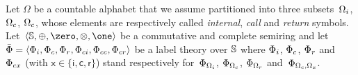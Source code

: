 \noindent
\label{sec:SWVPA-def}
Let $\Omega$ be a countable alphabet 
that we assume partitioned into three 
subsets~$\Omegai$, $\Omegac$, $\Omegac$,
whose elements are respectively called 
\emph{internal}, \emph{call} and \emph{return} symbols.
Let~$\< \Semiring, \oplus, \zero, \otimes, \one>$ be a commutative and complete semiring and let  
$\bar\Phi = \< \Phii, \Phic, \Phir, \Phici, \Phicc, \Phicr>$ 
be a label theory over $\mathbb{S}$
where $\Phii$, $\Phic$, $\Phir$ and~$\Phicx$ (with $\mathsf{x} \in \{ \mathsf{i}, \mathsf{c}, \mathsf{r}\}$) 
stand respectively 
for~$\Phi_\Omegai$, $\Phi_\Omegac$, $\Phi_\Omegar$ and~$\Phi_{\Omegac, \Omega_\mathsf{x}}$.
%


